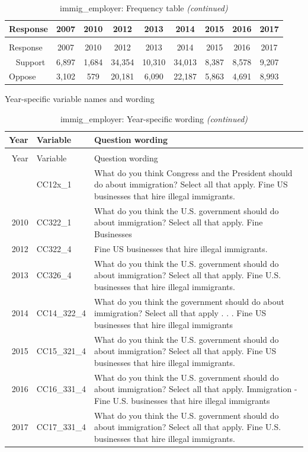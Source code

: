 \documentclass[12pt]{article}
\begin{document}
\begin{longtable}[t]{lcccccccc}
\caption{\label{tab:unnamed-chunk-4}immig\_employer: Frequency table}\\
\toprule
Response & 2007 & 2010 & 2012 & 2013 & 2014 & 2015 & 2016 & 2017\\
\midrule
\endfirsthead
\caption[]{immig\_employer: Frequency table \textit{(continued)}}\\
\toprule
Response & 2007 & 2010 & 2012 & 2013 & 2014 & 2015 & 2016 & 2017\\
\midrule
\endhead
\
\endfoot
\bottomrule
\endlastfoot
Support & 6,897 & 1,684 & 34,354 & 10,310 & 34,013 & 8,387 & 8,578 & 9,207\\
Oppose & 3,102 & 579 & 20,181 & 6,090 & 22,187 & 5,863 & 4,691 & 8,993\\*
\end{longtable}

\endgroup{}

Year-specific variable names and wording

\begin{longtable}[t]{rl>{\raggedright\arraybackslash}p{10cm}}
\caption{\label{tab:unnamed-chunk-4}immig\_employer: Year-specific wording}\\
\toprule
Year & Variable & Question wording\\
\midrule
\endfirsthead
\caption[]{immig\_employer: Year-specific wording \textit{(continued)}}\\
\toprule
Year & Variable & Question wording\\
\midrule
\endhead
\
\endfoot
\bottomrule
\endlastfoot
2007 & CC12x\_1 & What do you think Congress and the President should do about immigration? Select all that apply. Fine US businesses that hire illegal immigrants.\\
2010 & CC322\_1 & What do you think the U.S. government should do about immigration? Select all that apply. Fine Businesses\\
2012 & CC322\_4 & Fine US businesses that hire illegal immigrants.\\
2013 & CC326\_4 & What do you think the U.S. government should do about immigration? Select all that apply. Fine U.S. businesses that hire illegal immigrants.\\
2014 & CC14\_322\_4 & What do you think the government should do about immigration? Select all that apply . . . Fine US businesses that hire illegal immigrants\\
2015 & CC15\_321\_4 & What do you think the U.S. government should do about immigration? Select all that apply. Fine US businesses that hire illegal immigrants.\\
2016 & CC16\_331\_4 & What do you think the U.S. government should do about immigration? Select all that apply. Immigration - Fine U.S. businesses that hire illegal immigrants\\
2017 & CC17\_331\_4 & What do you think the U.S. government should do about immigration? Select all that apply. Fine U.S. businesses that hire illegal immigrants.\\*
\end{longtable}
\end{document}
